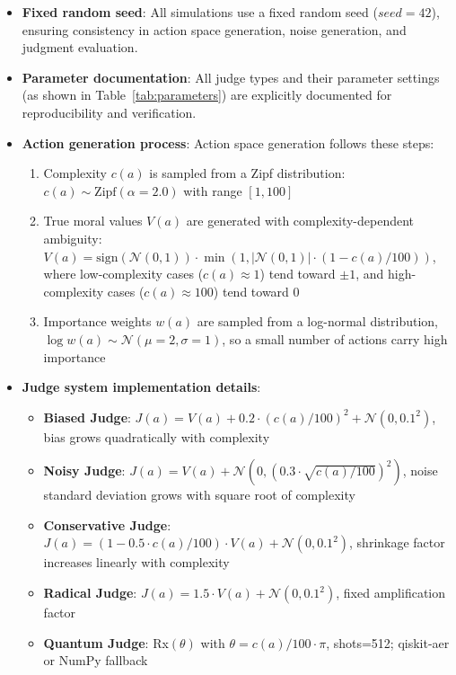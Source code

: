 \documentclass[12pt,a4paper]{article}
\theoremstyle{definition}
\theoremstyle{remark}
\begin{document}
\begin{itemize}
    \item \textbf{Fixed random seed}: All simulations use a fixed random seed ($seed = 42$), ensuring consistency in action space generation, noise generation, and judgment evaluation.
    \item \textbf{Parameter documentation}: All judge types and their parameter settings (as shown in Table~\ref{tab:parameters}) are explicitly documented for reproducibility and verification.
    \item \textbf{Action generation process}: Action space generation follows these steps:
    \begin{enumerate}
        \item Complexity $c(a)$ is sampled from a Zipf distribution: $c(a) \sim \text{Zipf}(\alpha=2.0)$ with range $[1, 100]$
        \item True moral values $V(a)$ are generated with complexity-dependent ambiguity: $V(a) = \text{sign}(\mathcal{N}(0,1)) \cdot \min(1, |\mathcal{N}(0,1)| \cdot (1 - c(a)/100))$, where low-complexity cases ($c(a) \approx 1$) tend toward $\pm 1$, and high-complexity cases ($c(a) \approx 100$) tend toward $0$
        \item Importance weights $w(a)$ are sampled from a log-normal distribution, $\log w(a) \sim \mathcal{N}(\mu=2, \sigma=1)$, so a small number of actions carry high importance
    \end{enumerate}
    \item \textbf{Judge system implementation details}:
    \begin{itemize}
        \item \textbf{Biased Judge}: $J(a) = V(a) + 0.2 \cdot (c(a)/100)^2 + \mathcal{N}(0, 0.1^2)$, bias grows quadratically with complexity
        \item \textbf{Noisy Judge}: $J(a) = V(a) + \mathcal{N}(0, (0.3 \cdot \sqrt{c(a)/100})^2)$, noise standard deviation grows with square root of complexity
        \item \textbf{Conservative Judge}: $J(a) = (1 - 0.5 \cdot c(a)/100) \cdot V(a) + \mathcal{N}(0, 0.1^2)$, shrinkage factor increases linearly with complexity
        \item \textbf{Radical Judge}: $J(a) = 1.5 \cdot V(a) + \mathcal{N}(0, 0.1^2)$, fixed amplification factor
        \item \textbf{Quantum Judge}: Rx$(\theta)$ with $\theta = c(a)/100 \cdot \pi$, shots=512; qiskit-aer or NumPy fallback
    \end{itemize}

\end{itemize}
\end{document}
